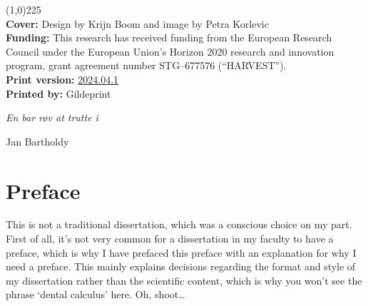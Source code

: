 \documentclass[
  b5paper,
]{book}
\renewcommand*\contentsname{Table of contents}
\newcommand\contentsname{Table of contents}
\begin{document}
\begingroup
\hspace{0.000001cm}
\vfill
\begin{flushleft}
\line(1,0){225} \\ %
\textbf{Cover:} Design by Krijn Boom and image by Petra
Korlevic \\[0.4cm]
\textbf{Funding:} This research has received funding from the European
Research Council under the European Union's Horizon 2020 research and
innovation program, grant agreement number STG--677576
(``HARVEST''). \\[0.4cm] 
\textbf{Print version:} \href{https://doi.org/10.5281/zenodo.11077009}{2024.04.1} \\[0.4cm] 
 \textbf{Printed by:} Gildeprint \\[0.4cm] 
\end{flushleft}
\endgroup

\frontmatter
%
\clearpage
\thispagestyle{empty}
\vspace*{\fill}
\vspace*{3cm}
\hfill\textit{En bar røv at trutte i}
\par
\hfill\vspace*{4cm} Jan Bartholdy
\vspace*{\fill}

\renewcommand*\contentsname{Table of contents}
{
\setcounter{tocdepth}{2}
\tableofcontents
}
\listoffigures
\listoftables
{}
\mainmatter
{}\label{preface}

\chapter*{Preface}


This is not a traditional dissertation, which was a conscious choice on
my part. First of all, it's not very common for a dissertation in my
faculty to have a preface, which is why I have prefaced this preface
with an explanation for why I need a preface. This mainly explains
decisions regarding the format and style of my dissertation rather than
the scientific content, which is why you won't see the phrase `dental
calculus' here. Oh, shoot\ldots{}
\end{document}
